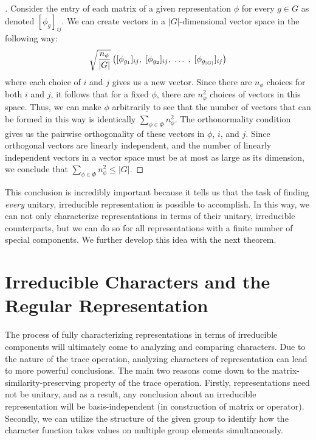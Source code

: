 \begin{proof}[\cite{Tung}] Consider the entry of each matrix of a given representation $\phi$ for every $g \in G$ as denoted $[\phi_g]_{ij}$. We can create vectors in a $|G|$-dimensional vector space in the following way:
$$\sqrt{\frac{n_\phi}{|G|}}\left([\phi_{g_1}]_{ij},\hspace{1mm} [\phi_{g_2}]_{ij}, \hspace{1mm}\hdots \hspace{1mm},\hspace{1mm} [\phi_{g_{|G|}}]_{ij}\right)$$
where each choice of $i$ and $j$ gives us a new vector. Since there are $n_\phi$ choices for both $i$ and $j$, it follows that for a fixed $\phi$, there are $n_\phi^2$ choices of vectors in this space. Thus, we can make $\phi$ arbitrarily to see that the number of vectors that can be formed in this way is identically $\sum_{\phi \in \Phi}n^2_\phi$. The orthonormality condition gives us the pairwise orthogonality of these vectors in $\phi$, $i$, and $j$. Since orthogonal vectors are linearly independent, and the number of linearly independent vectors in a vector space must be at most as large as its dimension, we conclude that $\sum_{\phi \in \Phi}n^2_\phi \leq |G|$.  \end{proof}


This conclusion is incredibly important because it tells us that the task of finding \textit{every} unitary, irreducible representation is possible to accomplish. In this way, we can not only characterize representations in terms of their unitary, irreducible counterparts, but we can do so for all representations with a finite number of special components. We further develop this idea with the next theorem.


\section{Irreducible Characters and the Regular Representation}

The process of fully characterizing representations in terms of irreducible components will ultimately come to analyzing and comparing characters. Due to the nature of the trace operation, analyzing characters of representation can lead to more powerful conclusions. The main two reasons come down to the matrix-similarity-preserving property of the trace operation. Firstly, representations need not be unitary, and as a result, any conclusion about an irreducible representation will be basis-independent (in construction of matrix or operator). Secondly, we can utilize the structure of the given group to identify how the character function takes values on multiple group elements simultaneously. 


